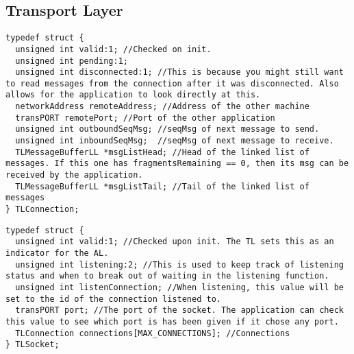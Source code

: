 \subsection{Transport Layer}

\begin{lstlisting}
typedef struct {
  unsigned int valid:1; //Checked on init.
  unsigned int pending:1;
  unsigned int disconnected:1; //This is because you might still want to read messages from the connection after it was disconnected. Also allows for the application to look directly at this.
  networkAddress remoteAddress; //Address of the other machine
  transPORT remotePort; //Port of the other application
  unsigned int outboundSeqMsg; //seqMsg of next message to send.
  unsigned int inboundSeqMsg;  //seqMsg of next message to receive.
  TLMessageBufferLL *msgListHead; //Head of the linked list of messages. If this one has fragmentsRemaining == 0, then its msg can be received by the application.
  TLMessageBufferLL *msgListTail; //Tail of the linked list of messages
} TLConnection;
\end{lstlisting}


\begin{lstlisting}
typedef struct {
  unsigned int valid:1; //Checked upon init. The TL sets this as an indicator for the AL.
  unsigned int listening:2; //This is used to keep track of listening status and when to break out of waiting in the listening function.
  unsigned int listenConnection; //When listening, this value will be set to the id of the connection listened to.
  transPORT port; //The port of the socket. The application can check this value to see which port is has been given if it chose any port.
  TLConnection connections[MAX_CONNECTIONS]; //Connections
} TLSocket;
\end{lstlisting}

